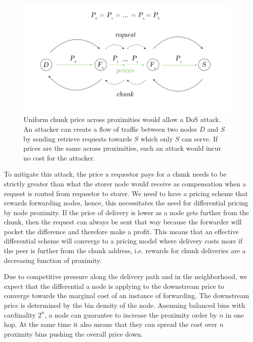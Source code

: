 \begin{figure}[htbp]
   \centering
   \includegraphics[width=\textwidth]{fig/ddos-uniform-price.pdf}
   \caption[Uniform chunk price across proximities would allow a DoS \statusgreen]{Uniform chunk price across proximities would allow a DoS attack. An attacker can create a flow of traffic between two nodes $D$ and $S$ by sending retrieve requests towards $S$ which only $S$ can serve. If prices are the same across proximities, such an attack would incur no cost for the attacker.}
   \label{fig:ddos-uniform-price}
\end{figure}

To mitigate this attack, the price a requestor pays for a chunk needs to be strictly greater than what the storer node would receive as compensation when a request is routed from requestor to storer. We need to have a pricing scheme that rewards forwarding nodes, hence, this necessitates the need for differential pricing by node proximity. If the price of delivery is lower as a node gets further from the chunk, then the request can always be sent that way because the forwarder will pocket the difference and therefore make a profit. This means that an effective differential scheme will converge to a pricing model where delivery costs more if the peer is further from the chunk address, i.e. rewards for chunk deliveries are a decreasing function of proximity. 

Due to competitive pressure along the delivery path and in the neighborhood, we expect that the differential a node is applying to the downstream price to converge towards the marginal cost of an instance of forwarding.
The downstream price is determined by the bin density of the node. Assuming balanced bins with cardinality $2^n$, a node can guarantee to increase the proximity order by $n$ in one hop. At the same time it also means that they can spread the cost over $n$ proximity bins pushing the overall price down.



